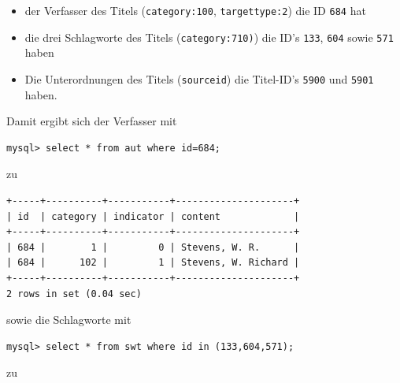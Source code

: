 \documentclass[11pt, twoside, a4paper, BCOR8mm, DIV12, bibtotoc,idxtotoc]{scrbook}
\begin{document}
\begin{itemize}
\item der Verfasser des Titels (\texttt{category:100}, \texttt{targettype:2}) die ID \texttt{684} hat
\item die drei Schlagworte des Titels (\texttt{category:710)}) die ID's
  \texttt{133}, \texttt{604} sowie \texttt{571} haben
\item Die Unterordnungen des Titels (\texttt{sourceid}) die Titel-ID's
  \texttt{5900} und \texttt{5901} haben.
\end{itemize}

Damit ergibt sich der Verfasser mit

\begin{verbatim}
mysql> select * from aut where id=684;
\end{verbatim}

zu 

\begin{shadowenv}
\begin{center}
\begin{verbatim}
+-----+----------+-----------+---------------------+
| id  | category | indicator | content             |
+-----+----------+-----------+---------------------+
| 684 |        1 |         0 | Stevens, W. R.      |
| 684 |      102 |         1 | Stevens, W. Richard |
+-----+----------+-----------+---------------------+
2 rows in set (0.04 sec)
\end{verbatim}
\end{center}
\end{shadowenv}

sowie die Schlagworte mit 

\begin{verbatim}
mysql> select * from swt where id in (133,604,571);
\end{verbatim}
zu
\end{document}
